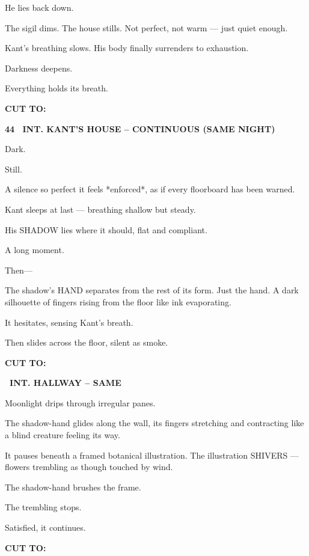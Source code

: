 \documentclass[12pt]{article}
\newcommand{\scene}[2]{%
  \vspace{1.8\baselineskip}%
  \noindent\textbf{#1 \ #2}\par\vspace{0.4\baselineskip}%
}
\newcommand{\transition}[1]{%
  \vspace{0.6\baselineskip}%
  \begin{flushright}\textbf{#1}\end{flushright}%
}
\begin{document}
He lies back down.

The sigil dims.
The house stills.
Not perfect, not warm —
just quiet enough.

Kant’s breathing slows.
His body finally surrenders to exhaustion.

Darkness deepens.

Everything holds its breath.

\transition{CUT TO:}


\scene{44}{INT. KANT'S HOUSE -- CONTINUOUS (SAME NIGHT)}

Dark.

Still.

A silence so perfect it feels *enforced*,
as if every floorboard has been warned.

Kant sleeps at last —
breathing shallow but steady.

His SHADOW lies where it should, flat and compliant.

A long moment.

Then—

The shadow’s HAND separates from the rest of its form.
Just the hand.
A dark silhouette of fingers rising from the floor like ink evaporating.

It hesitates, sensing Kant’s breath.

Then slides across the floor, silent as smoke.

\transition{CUT TO:}


\scene{}{INT. HALLWAY -- SAME}

Moonlight drips through irregular panes.

The shadow-hand glides along the wall,
its fingers stretching and contracting like a blind creature feeling its way.

It pauses beneath a framed botanical illustration.
The illustration SHIVERS —
flowers trembling as though touched by wind.

The shadow-hand brushes the frame.

The trembling stops.

Satisfied, it continues.

\transition{CUT TO:}

\end{document}
